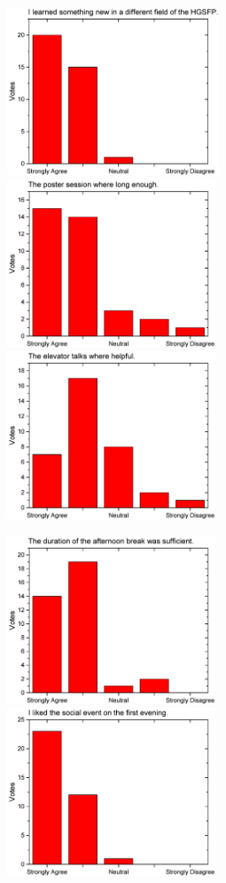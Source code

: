 \begin{figure}[H]
  \centering
  \begin{minipage}{.48\linewidth}
    \centering
      {\includegraphics[height=50mm]{figures/n/Graph15.pdf}}
      {\includegraphics[height=50mm]{figures/n/Graph16.pdf}}
      {\includegraphics[height=50mm]{figures/n/Graph17.pdf}}
  \end{minipage}\quad
  \begin{minipage}{.48\linewidth}
    \centering
      {\includegraphics[height=50mm]{figures/n/Graph18.pdf}}
      {\includegraphics[height=50mm]{figures/n/Graph19.pdf}}

\end{minipage}
\end{figure}
